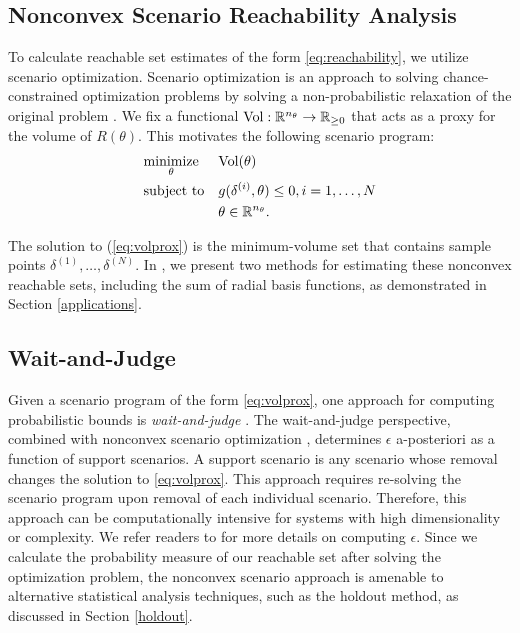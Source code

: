 \documentclass[letterpaper, 10 pt, conference]{ieeeconf}  %
\begin{document}
\subsection{Nonconvex Scenario Reachability Analysis}
To calculate reachable set estimates of the form \eqref{eq:reachability}, we utilize scenario optimization. Scenario optimization is an approach to solving chance-constrained optimization problems by solving a non-probabilistic relaxation of the original problem \cite{dembo1991scenario}. We fix a functional ${\rm Vol}: \mathbb{R}^{n_{\theta}} \rightarrow \mathbb{R}_{\geq 0}$ that acts as a proxy for the volume of $R(\theta)$. This motivates the following scenario program:
\begin{equation}
\label{eq:volprox}
\begin{aligned}
& \underset{\theta}{\text{minimize}}
& & \rm{Vol}(\theta) \\
& \text{subject to}
& & g(\delta^{(i)}, \theta) \leq 0, i = 1, \dotsc, N\\
& & & \theta \in \mathbb{R}^{n_{\theta}}.
\end{aligned}
\end{equation} 

The solution to (\ref{eq:volprox}) is the minimum-volume set that contains sample points $\delta^{(1)}, \dotsc, \delta^{(N)}$. In \cite{pmlr-v242-dietrich24a}, we present two methods for estimating these nonconvex reachable sets, including the sum of radial basis functions, as demonstrated in Section \ref{applications}.


\subsection{Wait-and-Judge}
Given a scenario program of the form \eqref{eq:volprox}, one approach for computing probabilistic bounds is \textit{wait-and-judge} \cite{pmlr-v242-dietrich24a}. The wait-and-judge perspective, combined with nonconvex scenario optimization \cite{8299432},
determines $\epsilon$ a-posteriori as a function of support scenarios. A support scenario is any scenario whose removal changes the solution to \eqref{eq:volprox}. This approach requires re-solving the scenario program upon removal of each individual scenario. Therefore, this approach can be computationally intensive for systems with high dimensionality or complexity. We refer readers to \cite{pmlr-v242-dietrich24a} for more details on computing $\epsilon$. Since we calculate the probability measure of our reachable set after solving the optimization problem, the nonconvex scenario approach is amenable to alternative statistical analysis techniques, such as the holdout method, as discussed in Section \ref{holdout}.
\end{document}
